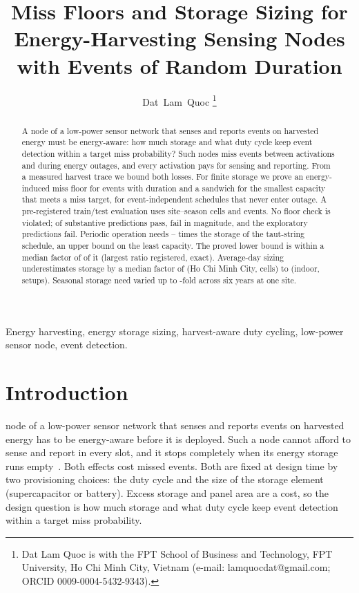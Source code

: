 \title{Miss Floors and Storage Sizing for Energy-Harvesting Sensing Nodes with Events of Random Duration}
\author{Dat~Lam~Quoc%
\thanks{Dat Lam Quoc is with the FPT School of Business and Technology, FPT University, Ho Chi Minh City, Vietnam (e-mail: lamquocdat@gmail.com; ORCID 0009-0004-5432-9343).}}
\maketitle

\begin{abstract}
A node of a low-power sensor network that senses and reports events on harvested energy must be energy-aware: how much storage and what duty cycle keep event detection within a target miss probability? Such nodes miss events between activations and during energy outages, and every activation pays for sensing and reporting. From a measured harvest trace we bound both losses. For finite storage we prove an energy-induced miss floor for events with duration and a sandwich for the smallest capacity that meets a miss target, for event-independent schedules that never enter outage. A pre-registered train/test evaluation uses \nCellsSS{} site--season cells and \nEv{} events. No floor check is violated; \nSubstPass{} of \nSubst{} substantive predictions pass, \nSubstFail{} fail in magnitude, and the \nExpl{} exploratory predictions fail. Periodic operation needs \AiiTsInvLo--\AiiTsInvHi{} times the storage of the taut-string schedule, an upper bound on the least capacity. The proved lower bound is within a median factor of \AiiMedLBTS{} of it (largest ratio \AiiMaxLBTSreg{} registered, \AiiMaxLBTS{} exact). Average-day sizing underestimates storage by a median factor of \avgHCMC{} (Ho Chi Minh City, \nCellHCMC{} cells) to \avgIn{} (indoor, \nCellIn{} setups). Seasonal storage need varied up to \AivbHi{}-fold across six years at one site.
\end{abstract}

\begin{IEEEkeywords}
Energy harvesting, energy storage sizing, harvest-aware duty cycling, low-power sensor node, event detection.
\end{IEEEkeywords}

\section{Introduction}\label{sec:intro}
 node of a low-power sensor network that senses and reports events on harvested energy has to be energy-aware before it is deployed. Such a node cannot afford to sense and report in every slot, and it stops completely when its energy storage runs empty~\cite{yue2026iotj,vanleemput2023iotj}. Both effects cost missed events. Both are fixed at design time by two provisioning choices: the duty cycle and the size of the storage element (supercapacitor or battery). Excess storage and panel area are a cost, so the design question is how much storage and what duty cycle keep event detection within a target miss probability.


